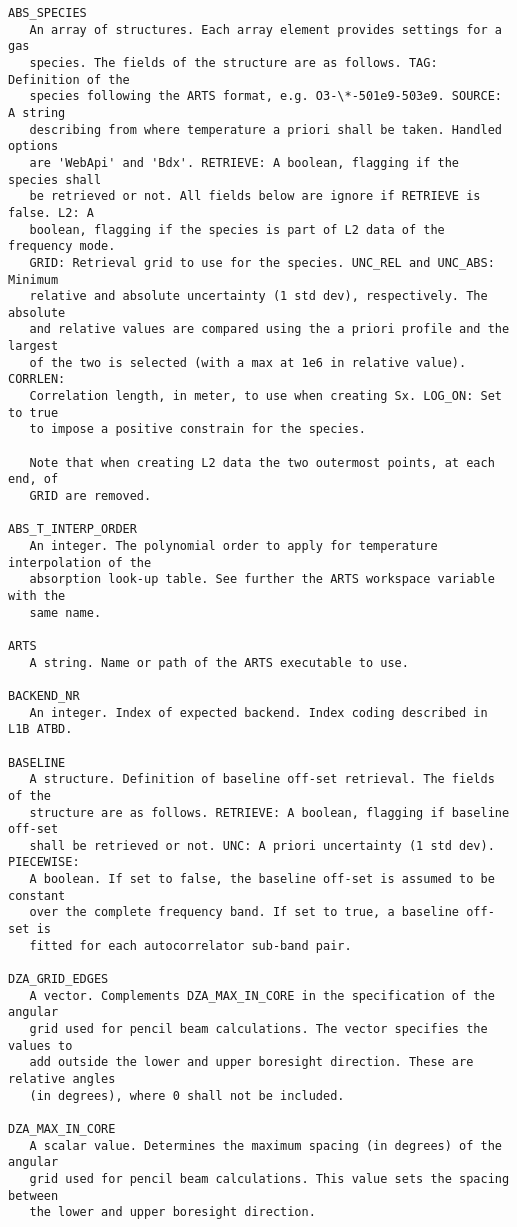 \begin{verbatim}
ABS_SPECIES
   An array of structures. Each array element provides settings for a gas
   species. The fields of the structure are as follows. TAG: Definition of the
   species following the ARTS format, e.g. O3-\*-501e9-503e9. SOURCE: A string
   describing from where temperature a priori shall be taken. Handled options
   are 'WebApi' and 'Bdx'. RETRIEVE: A boolean, flagging if the species shall
   be retrieved or not. All fields below are ignore if RETRIEVE is false. L2: A
   boolean, flagging if the species is part of L2 data of the frequency mode.
   GRID: Retrieval grid to use for the species. UNC_REL and UNC_ABS: Minimum
   relative and absolute uncertainty (1 std dev), respectively. The absolute
   and relative values are compared using the a priori profile and the largest
   of the two is selected (with a max at 1e6 in relative value). CORRLEN:
   Correlation length, in meter, to use when creating Sx. LOG_ON: Set to true
   to impose a positive constrain for the species.

   Note that when creating L2 data the two outermost points, at each end, of
   GRID are removed. 

ABS_T_INTERP_ORDER
   An integer. The polynomial order to apply for temperature interpolation of the
   absorption look-up table. See further the ARTS workspace variable with the
   same name.

ARTS
   A string. Name or path of the ARTS executable to use.

BACKEND_NR
   An integer. Index of expected backend. Index coding described in L1B ATBD.

BASELINE
   A structure. Definition of baseline off-set retrieval. The fields of the
   structure are as follows. RETRIEVE: A boolean, flagging if baseline off-set
   shall be retrieved or not. UNC: A priori uncertainty (1 std dev). PIECEWISE:
   A boolean. If set to false, the baseline off-set is assumed to be constant
   over the complete frequency band. If set to true, a baseline off-set is
   fitted for each autocorrelator sub-band pair.

DZA_GRID_EDGES
   A vector. Complements DZA_MAX_IN_CORE in the specification of the angular
   grid used for pencil beam calculations. The vector specifies the values to
   add outside the lower and upper boresight direction. These are relative angles
   (in degrees), where 0 shall not be included.

DZA_MAX_IN_CORE
   A scalar value. Determines the maximum spacing (in degrees) of the angular
   grid used for pencil beam calculations. This value sets the spacing between
   the lower and upper boresight direction.


\end{verbatim}
